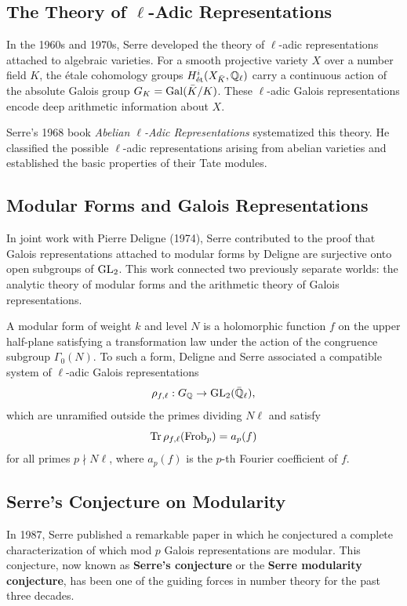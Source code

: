 \subsection{The Theory of \texorpdfstring{\(\ell\)}{ell}-Adic Representations}

In the 1960s and 1970s, Serre developed the theory of \(\ell\)-adic representations attached to algebraic varieties. For a smooth projective variety \(X\) over a number field \(K\), the \'etale cohomology groups \(H^i_{\text{\'et}}(X_{\bar{K}}, \mathbb{Q}_\ell)\) carry a continuous action of the absolute Galois group \(G_K = \operatorname{Gal}(\bar{K}/K)\). These \(\ell\)-adic Galois representations encode deep arithmetic information about \(X\).

Serre's 1968 book \textit{Abelian \(\ell\)-Adic Representations} systematized this theory. He classified the possible \(\ell\)-adic representations arising from abelian varieties and established the basic properties of their Tate modules.

\subsection{Modular Forms and Galois Representations}

In joint work with Pierre Deligne (1974), Serre contributed to the proof that Galois representations attached to modular forms by Deligne are surjective onto open subgroups of \(\operatorname{GL}_2\). This work connected two previously separate worlds: the analytic theory of modular forms and the arithmetic theory of Galois representations.

A modular form of weight \(k\) and level \(N\) is a holomorphic function \(f\) on the upper half-plane satisfying a transformation law under the action of the congruence subgroup \(\Gamma_0(N)\). To such a form, Deligne and Serre associated a compatible system of \(\ell\)-adic Galois representations
\[
\rho_{f,\ell}: G_{\mathbb{Q}} \to \operatorname{GL}_2(\bar{\mathbb{Q}}_\ell),
\]
which are unramified outside the primes dividing \(N\ell\) and satisfy
\[
\Tr \rho_{f,\ell}(\operatorname{Frob}_p) = a_p(f)
\]
for all primes \(p \nmid N\ell\), where \(a_p(f)\) is the \(p\)-th Fourier coefficient of \(f\).

\subsection{Serre's Conjecture on Modularity}

In 1987, Serre published a remarkable paper in which he conjectured a complete characterization of which mod \(p\) Galois representations are modular. This conjecture, now known as \textbf{Serre's conjecture} or the \textbf{Serre modularity conjecture}, has been one of the guiding forces in number theory for the past three decades.

